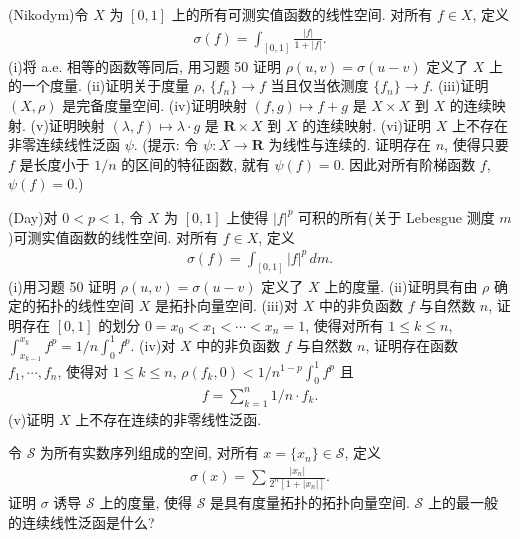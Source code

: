 \documentclass[../../main.tex]{subfiles}
\begin{document}
\begin{exercise}\label{exercise:ch14-51}
(Nikodym)令 $X$ 为 $[0,1]$ 上的所有可测实值函数的线性空间. 对所有 $f\in X$, 定义
\begin{align*}
\sigma(f)=\int_{[0,1]}\frac{|f|}{1+|f|}.
\end{align*}
(i)将 a.e. 相等的函数等同后, 用习题 50 证明 $\rho(u,v)=\sigma(u-v)$ 定义了 $X$ 上的一个度量.
(ii)证明关于度量 $\rho$, $\{f_{n}\}\to f$ 当且仅当依测度 $\{f_{n}\}\to f$.
(iii)证明 $(X,\rho)$ 是完备度量空间.
(iv)证明映射 $(f,g)\mapsto f+g$ 是 $X\times X$ 到 $X$ 的连续映射.
(v)证明映射 $(\lambda,f)\mapsto\lambda\cdot g$ 是 $\mathbf{R}\times X$ 到 $X$ 的连续映射.
(vi)证明 $X$ 上不存在非零连续线性泛函 $\psi$. (提示: 令 $\psi:X\to\mathbf{R}$ 为线性与连续的. 证明存在 $n$, 使得只要 $f$ 是长度小于 $1/n$ 的区间的特征函数, 就有 $\psi(f)=0$. 因此对所有阶梯函数 $f$, $\psi(f)=0$.)
\end{exercise}

\begin{exercise}\label{exercise:ch14-52}
(Day)对 $0<p<1$, 令 $X$ 为 $[0,1]$ 上使得 $|f|^{p}$ 可积的所有(关于 Lebesgue 测度 $m$)可测实值函数的线性空间. 对所有 $f\in X$, 定义
\begin{align*}
\sigma(f)=\int_{[0,1]}|f|^{p}\,dm.
\end{align*}
(i)用习题 50 证明 $\rho(u,v)=\sigma(u-v)$ 定义了 $X$ 上的度量.
(ii)证明具有由 $\rho$ 确定的拓扑的线性空间 $X$ 是拓扑向量空间.
(iii)对 $X$ 中的非负函数 $f$ 与自然数 $n$, 证明存在 $[0,1]$ 的划分 $0=x_{0}<x_{1}<\cdots<x_{n}=1$, 使得对所有 $1\leqslant k\leqslant n$, $\int_{x_{k-1}}^{x_{k}}f^{p}=1/n\int_{0}^{1}f^{p}$.
(iv)对 $X$ 中的非负函数 $f$ 与自然数 $n$, 证明存在函数 $f_{1},\cdots,f_{n}$, 使得对 $1\leqslant k\leqslant n$, $\rho(f_{k},0)<1/n^{1-p}\int_{0}^{1}f^{p}$ 且
\begin{align*}
f=\sum_{k=1}^{n}1/n\cdot f_{k}.
\end{align*}
(v)证明 $X$ 上不存在连续的非零线性泛函.
\end{exercise}

\begin{exercise}\label{exercise:ch14-53}
令 $\mathcal{S}$ 为所有实数序列组成的空间, 对所有 $x=\{x_{n}\}\in\mathcal{S}$, 定义
\begin{align*}
\sigma(x)=\sum\frac{|x_{n}|}{2^{n}[1+|x_{n}|]}.
\end{align*}
证明 $\sigma$ 诱导 $\mathcal{S}$ 上的度量, 使得 $\mathcal{S}$ 是具有度量拓扑的拓扑向量空间. $\mathcal{S}$ 上的最一般的连续线性泛函是什么?
\end{exercise}
\end{document}
